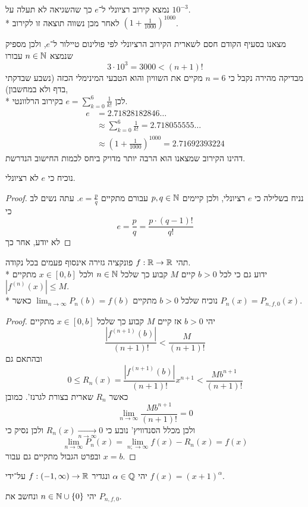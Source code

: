 \Subquestion{}
נמצא קירוב רציונלי ל־$e$ כך שהשגיאה לא תעלה על $10^{-3}$. \\*
לאחר מכן נשווה תוצאה זו לקירוב ${(1 + \frac{1}{1000})}^{1000}$.

מצאנו בסעיף הקודם חסם לשארית הקירוב הרציונלי לפי פולינום טיילור ל־$e$, ולכן מספיק שנמצא $n \in \mathbb{N}$ עבורו
\[
	3 \cdot 10^3 = 3000 < (n + 1)!
\]
מבדיקה מהירה נקבל כי $n = 6$ מקיים את השוויון והוא הטבעי המינימלי הכזה (נשבע שבדקתי בדף ולא במחשבון), \\*
לכן $e = \sum_{k = 0}^{6} \frac{1}{k!}$ בקירוב הרלוונטי.
\begin{align*}
	e & = 2.71828182846\dots \\
	& \approx \sum_{k = 0}^{6} \frac{1}{k!} = 2.718055555\dots \\
	& \approx {(1 + \frac{1}{1000})}^{1000} = 2.71692393224
\end{align*}
דהינו הקירוב שמצאנו הוא הרבה יותר מדויק ביחס לכמות החישוב הנדרשת.

\Subquestion{}
נוכיח כי $e$ לא רציונלי.
\begin{proof}
	נניח בשלילה כי $e$ רציונלי, ולכן קיימים $p, q \in \mathbb{N}$ עבורם מתקיים $e = \frac{p}{q}$.
	עתה נשים לב כי
	\[
		e = \frac{p}{q} = \frac{p \cdot (q - 1)!}{q!}
	\]
	לא יודע, אחר כך
\end{proof}

\Question{}
תהי $f : \mathbb{R} \to \mathbb{R}$ פונקציה גזירה אינסוף פעמים בכל נקודה. \\*
ידוע גם כי לכל $b > 0$ קיים $M$ קבוע כך שלכל $n \in \mathbb{N}$ ולכל $x \in [0, b]$ מתקיים $|f^{(n)}(x)| \le M$. \\*
נוכיח שלכל $b > 0$ מתקיים $\lim_{n \to \infty} P_n(b) = f(b)$ כאשר $P_n(x) = P_{n, f, 0}(x)$.
\begin{proof}
	יהי $b > 0$ אז קיים $M$ קבוע כך שלכל $x \in [0, b]$ מתקיים
	\[
		\frac{|f^{(n + 1)}(b)|}{(n + 1)!} < \frac{M}{(n + 1)!}
	\]
	ובהתאם גם
	\[
		0 \le R_n(x) = \frac{|f^{(n + 1)}(b)|}{(n + 1)!}x^{n + 1} < \frac{M b^{n + 1}}{(n + 1)!}
	\]
	כאשר $R_n$ שארית בצורת לגרנז'.
	כמובן
	\[
		\lim_{n \to \infty} \frac{M b^{n + 1}}{(n + 1)!} = 0
	\]
	ולכן מכלל הסנדוויץ' נובע כי $R_n(x) \xrightarrow[n \to \infty]{} 0$ ולכן נסיק כי
	\[
		\lim_{n \to \infty} P_n(x) = \lim_{n; \to \infty} f(x) - R_n(x) = f(x)
	\]
	ובפרט הגבול מתקיים גם עבור $x = b$.
\end{proof}

\Question{}
יהי $\alpha \in \mathbb{Q}$ ונגדיר $f : (-1, \infty) \to \mathbb{R}$ על־ידי $f(x) = {(x + 1)}^\alpha$.

\Subquestion{}
יהי $n \in \mathbb{N} \cup \{0\}$ ונחשב את $P_{n, f, 0}$.

